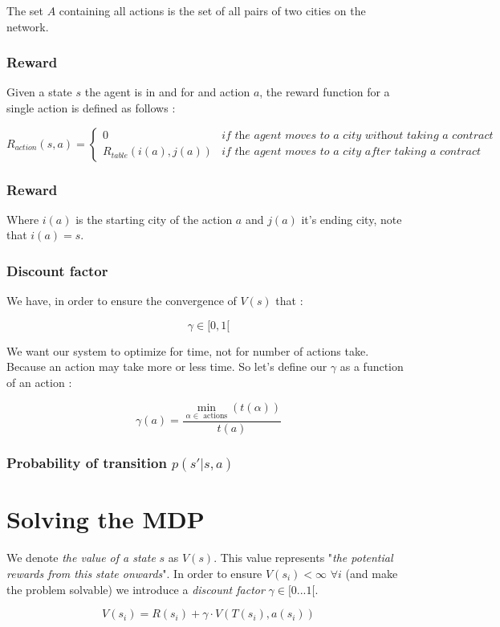 \documentclass[11pt]{article}
\begin{document}
The set $A$ containing all actions is the set of all pairs of two cities on the network.
\subsubsection{Reward}

Given a state $s$ the agent is in and for and action $a$, the reward function for a single action is defined as follows :

\[R_{action}(s,a) = \begin{cases}
    0               & \textit{if the agent moves to a city without taking a contract} \\
    R_{table}(i(a),j(a))    & \textit{if the agent moves to a city after taking a contract}
\end{cases}\]

\subsubsection{Reward}

Where  $i(a)$ is the starting city of the action $a$ and $j(a)$ it's ending city, note that $i(a) = s$.

\subsubsection{Discount factor}

We have, in order to ensure the convergence of $V(s)$ that :

\[ \gamma \in [0,1[ \]

We want our system to optimize for time, not for number of actions take. Because an action may take more or less time. So let's define our $\gamma$ as a function of an action :

\[\gamma (a) = \frac{ \min_{\alpha \in \text{ actions}} (t(\alpha))}{t(a)}\]

\subsubsection{Probability of transition $p(s'|s,a)$}


\newpage

\section{Solving the MDP}

We denote \textit{the value of a state} $s$ as $V(s)$. This value represents "\textit{the potential rewards from this state onwards}". In order to ensure $V(s_i) < \infty$ $\forall i$ (and make the problem solvable) we introduce a \textit{discount factor} $\gamma \in [0 ... 1 [$.

\[V(s_i) = R(s_i) + \gamma \cdot V(T(s_i),a(s_i))\]
\end{document}
